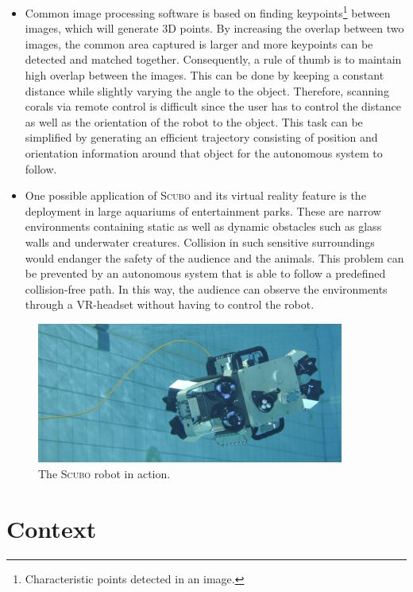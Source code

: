 \begin{itemize}
	\item 
	Common image processing software is based on finding keypoints\footnote{Characteristic points detected in an image.} between images, which will generate 3D points. By increasing the overlap between two images, the common area captured is larger and more keypoints can be detected and matched together. Consequently, a rule of thumb is to maintain high overlap between the images. This can be done by keeping a constant distance while slightly varying the angle to the object. Therefore, scanning corals via remote control is difficult since the user has to control the distance as well as the orientation of the robot to the object. This task can be simplified by generating an efficient trajectory consisting of position and orientation information around that object for the autonomous system to follow.
	\item 
	One possible application of \textsc{Scubo} and its virtual reality feature is the deployment in large aquariums of entertainment parks. These are narrow environments containing static as well as dynamic obstacles such as glass walls and underwater creatures. Collision in such sensitive surroundings would endanger the safety of the audience and the animals. This problem can be prevented by an autonomous system that is able to follow a predefined collision-free path. In this way, the audience can observe the environments through a VR-headset without having to control the robot. 
\end{itemize}

\begin{figure} [h]
	\centering
	\includegraphics[width=0.9\textwidth]{images/Scubo_robot.jpg}
	\caption{The \textsc{Scubo} robot in action.}
	\label{pics:scubo_robot}
\end{figure}
  
\section{Context}  
  
